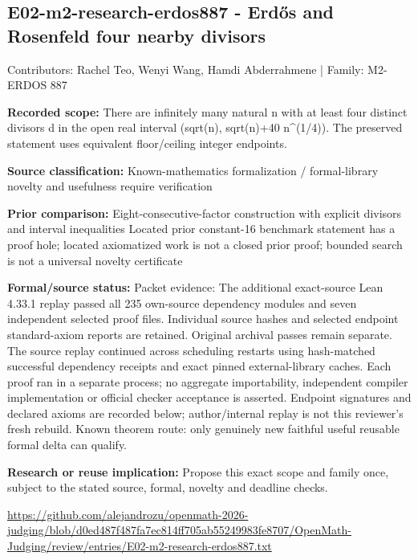 \documentclass[11pt,a4paper]{article}
\begin{document}
\begin{samepage}
\subsection{E02-m2-research-erdos887  -  Erdős and Rosenfeld four nearby divisors}
{\small Contributors: Rachel Teo, Wenyi Wang, Hamdi Abderrahmene | Family: M2-ERDOS 887\par}

\textbf{Recorded scope:} There are infinitely many natural n with at least four distinct divisors d in the open real interval (sqrt(n), sqrt(n)+40 n\textasciicircum{}(1/4)). The preserved statement uses equivalent floor/ceiling integer endpoints.

\end{samepage}
\textbf{Source classification:} Known-mathematics formalization / formal-library novelty and usefulness require verification

\textbf{Prior comparison:} Eight-consecutive-factor construction with explicit divisors and interval inequalities Located prior constant-16 benchmark statement has a proof hole; located axiomatized work is not a closed prior proof; bounded search is not a universal novelty certificate

\textbf{Formal/source status:} Packet evidence: The additional exact-source Lean 4.33.1 replay passed all 235 own-source dependency modules and seven independent selected proof files. Individual source hashes and selected endpoint standard-axiom reports are retained. Original archival passes remain separate. The source replay continued across scheduling restarts using hash-matched successful dependency receipts and exact pinned external-library caches. Each proof ran in a separate process; no aggregate importability, independent compiler implementation or official checker acceptance is asserted. Endpoint signatures and declared axioms are recorded below; author/internal replay is not this reviewer's fresh rebuild. Known theorem route: only genuinely new faithful useful reusable formal delta can qualify.

\textbf{Research or reuse implication:} Propose this exact scope and family once, subject to the stated source, formal, novelty and deadline checks.

{\small \url{https://github.com/alejandrozu/openmath-2026-judging/blob/d0ed487f487fa7ec814ff705ab55249983fe8707/OpenMath-Judging/review/entries/E02-m2-research-erdos887.txt}\par}
\end{document}
